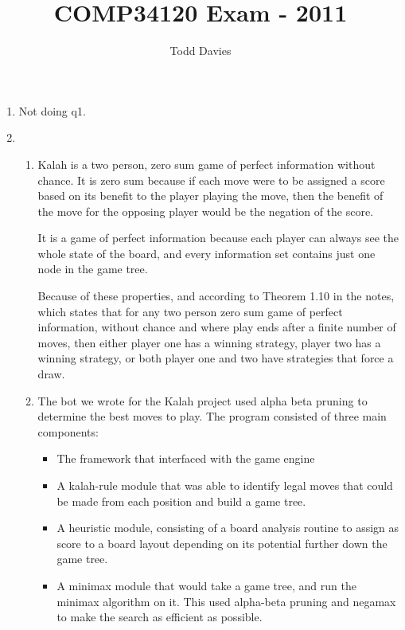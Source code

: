 \documentclass{report}
\title{COMP34120 Exam - 2011}
\author{Todd Davies}
\begin{document}
\maketitle

\begin{enumerate}
\item Not doing q1.
\item
  \begin{enumerate}
    \item Kalah is a two person, zero sum game of perfect information
      without chance. It is zero sum because if each move were to be
      assigned a score based on its benefit to the player playing the
      move, then the benefit of the move for the opposing player would
      be the negation of the score.

      It is a game of perfect information because each player can
      always see the whole state of the board, and every information
      set contains just one node in the game tree.

      Because of these properties, and according to Theorem 1.10 in
      the notes, which states that for any two person zero sum game of
      perfect information, without chance and where play ends after a
      finite number of moves, then either player one has a winning
      strategy, player two has a winning strategy, or both player one
      and two have strategies that force a draw.
    \item The bot we wrote for the Kalah project used alpha beta
      pruning to determine the best moves to play. The program
      consisted of three main components:
      \begin{itemize}
        \item The framework that
          interfaced with the game engine
        \item A kalah-rule module that was able to identify legal
          moves that could be made from each position and build a game
          tree.
        \item A heuristic module, consisting of a board analysis
          routine to assign as score to a board layout depending on
          its potential further down the game tree.
        \item A minimax module that would take a game tree, and run
          the minimax algorithm on it. This used alpha-beta pruning
          and negamax to make the search as efficient as possible.
      \end{itemize}


\end{enumerate}
\end{enumerate}
\end{document}
